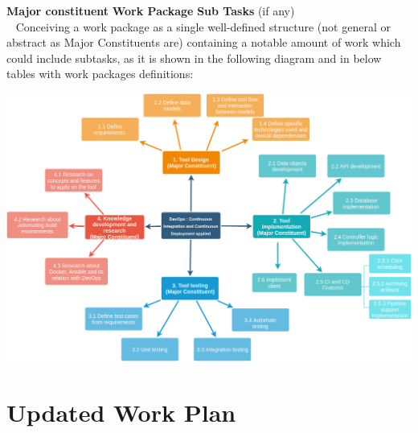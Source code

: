 \documentclass[a4paper]{article}
\begin{document}
\medskip
\textbf{Major constituent} \textrightarrow \textbf{Work Package} \textrightarrow \textbf{Sub Tasks} (if any)
\medskip\\~
Conceiving a work package as a single well-defined structure (not general or abstract as Major Constituents are) containing a notable amount of work which could include subtasks, as it is shown in the following diagram and in below tables with work packages definitions: 
\begin{center}
	\includegraphics[scale=0.21]{wp_breakdown}
\end{center}

\newpage


\section{Updated Work Plan}
\end{document}
